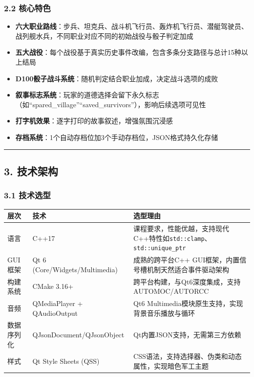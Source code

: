 \hypertarget{ux6838ux5fc3ux7279ux8272}{%
\subsubsection{2.2 核心特色}\label{ux6838ux5fc3ux7279ux8272}}

\begin{itemize}
\tightlist
\item
  \textbf{六大职业路线}：步兵、坦克兵、战斗机飞行员、轰炸机飞行员、潜艇驾驶员、战列舰水兵，不同职业对应不同的初始战役与骰子判定加成
\item
  \textbf{五大战役}：每个战役基于真实历史事件改编，包含多条分支路径与总计15种以上结局
\item
  \textbf{D100骰子战斗系统}：随机判定结合职业加成，决定战斗选项的成败
\item
  \textbf{叙事标志系统}：玩家的道德选择会留下永久标志（如``spared\_village''``saved\_survivors''），影响后续选项可见性
\item
  \textbf{打字机效果}：逐字打印的故事叙述，增强氛围沉浸感
\item
  \textbf{存档系统}：1个自动存档位加3个手动存档位，JSON格式持久化存储
\end{itemize}

\begin{center}\rule{0.5\linewidth}{0.5pt}\end{center}

\hypertarget{ux6280ux672fux67b6ux6784}{%
\subsection{3. 技术架构}\label{ux6280ux672fux67b6ux6784}}

\hypertarget{ux6280ux672fux9009ux578b}{%
\subsubsection{3.1 技术选型}\label{ux6280ux672fux9009ux578b}}

\begin{longtable}[]{@{}lll@{}}
\toprule
层次 & 技术 & 选型理由 \\
\midrule
\endhead
语言 & C++17 &
课程要求，性能优越，支持现代C++特性如\texttt{std::clamp}、\texttt{std::unique\_ptr} \\
GUI框架 & Qt 6 (Core/Widgets/Multimedia) & 成熟的跨平台C++
GUI框架，内置信号槽机制天然适合事件驱动架构 \\
构建系统 & CMake 3.16+ &
跨平台构建，与Qt6深度集成，支持AUTOMOC/AUTORCC \\
音频 & QMediaPlayer + QAudioOutput & Qt6
Multimedia模块原生支持，实现背景音乐播放与循环 \\
数据序列化 & QJsonDocument/QJsonObject &
Qt内置JSON支持，无需第三方依赖 \\
样式 & Qt Style Sheets (QSS) &
CSS语法，支持选择器、伪类和动态属性，实现暗色军工主题 \\
\bottomrule
\end{longtable}

